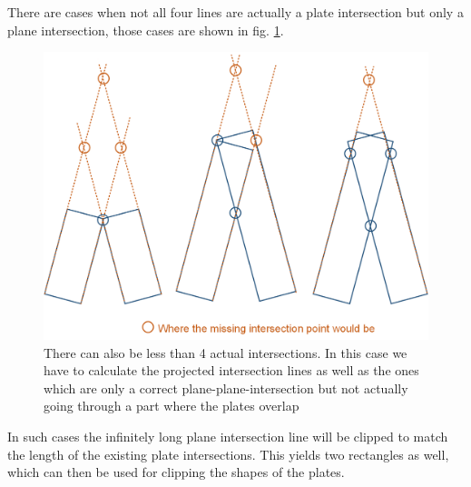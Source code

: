 \documentclass[../ClassicThesis.tex]{subfiles}
\begin{document}
There are cases when not all four lines are actually a plate intersection but only a plane intersection, those cases are shown in fig. \ref{fig:casesOfLines}. 
\begin{figure}[!ht]
\centering
\includegraphics[width=\columnwidth]{Images/10-joints-casesOfLines.png}
\caption{There can also be less than 4 actual intersections. In this case we have to calculate the projected intersection lines as well as the ones which are only a correct plane-plane-intersection but not actually going through a part where the plates overlap}
\label{fig:casesOfLines}
\end{figure}

In such cases the infinitely long plane intersection line will be clipped to match the length of the existing plate intersections. This yields two rectangles as well, which can then be used for clipping the shapes of the plates.
\end{document}
